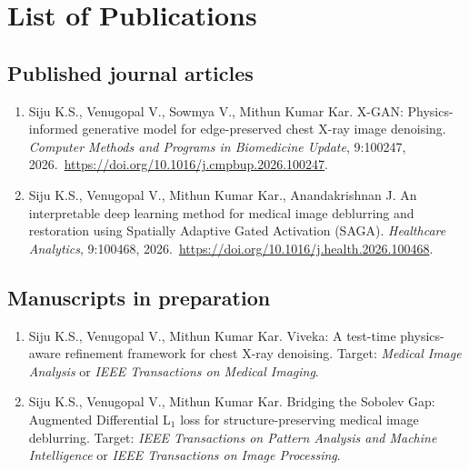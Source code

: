 
\section{List of Publications}
\label{sec:pub}
\subsection{Published journal articles}

\begin{enumerate}
	\item Siju K.S., Venugopal V., Sowmya V., Mithun Kumar Kar. X-GAN: Physics-informed generative model for edge-preserved chest X-ray image denoising. \textit{Computer Methods and Programs in Biomedicine Update}, 9:100247, 2026.~\url{https://doi.org/10.1016/j.cmpbup.2026.100247}.
	\item Siju K.S., Venugopal V., Mithun Kumar Kar., Anandakrishnan J. An interpretable deep learning method for medical image deblurring and restoration using Spatially Adaptive Gated Activation (SAGA). \textit{Healthcare Analytics}, 9:100468, 2026.~\url{https://doi.org/10.1016/j.health.2026.100468}.
\end{enumerate}

\subsection{Manuscripts in preparation}

\begin{enumerate}
	\item Siju K.S., Venugopal V., Mithun Kumar Kar. Viveka: A test-time physics-aware refinement framework for chest X-ray denoising. Target: \textit{Medical Image Analysis} or \textit{IEEE Transactions on Medical Imaging}.
	\item Siju K.S., Venugopal V., Mithun Kumar Kar. Bridging the Sobolev Gap: Augmented Differential L\(_1\) loss for structure-preserving medical image deblurring. Target: \textit{IEEE Transactions on Pattern Analysis and Machine Intelligence} or \textit{IEEE Transactions on Image Processing}.
\end{enumerate}
